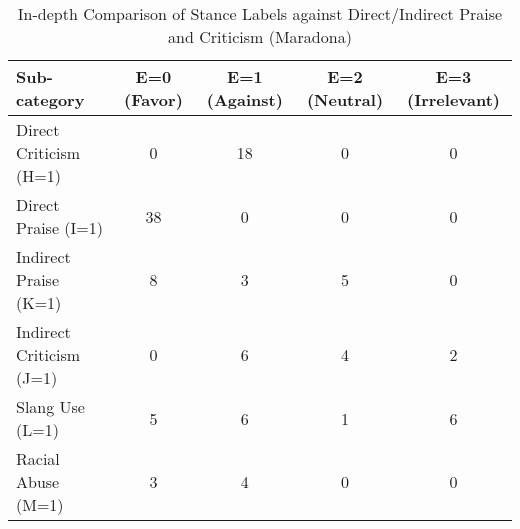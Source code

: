\documentclass{article}
\begin{document}
\begin{table}[htbp] %
    \centering %
    \caption{In-depth Comparison of Stance Labels against Direct/Indirect Praise and Criticism (Maradona) } %
    \label{tab:statistical_summary} %
    \renewcommand{\arraystretch}{1.2} %
    \begin{adjustbox}{max width=\linewidth} %
        \begin{tabular}{l c c c c} %
            \toprule %
            \textbf{Sub-category} & \textbf{E=0 (Favor)} & \textbf{E=1 (Against)} & \textbf{E=2 (Neutral)} & \textbf{E=3 (Irrelevant)} \\ %
            \midrule %
            Direct Criticism (H=1)  & 0  & 18 & 0  & 0 \\
            Direct Praise (I=1)     & 38 & 0  & 0  & 0 \\
            Indirect Praise (K=1)   & 8  & 3  & 5  & 0 \\
            Indirect Criticism (J=1) & 0  & 6  & 4  & 2 \\
            Slang Use (L=1)         & 5  & 6  & 1  & 6 \\
            Racial Abuse (M=1)      & 3  & 4  & 0  & 0 \\
            \bottomrule %
        \end{tabular}
    \end{adjustbox}
\end{table}

\FloatBarrier %
\end{document}
